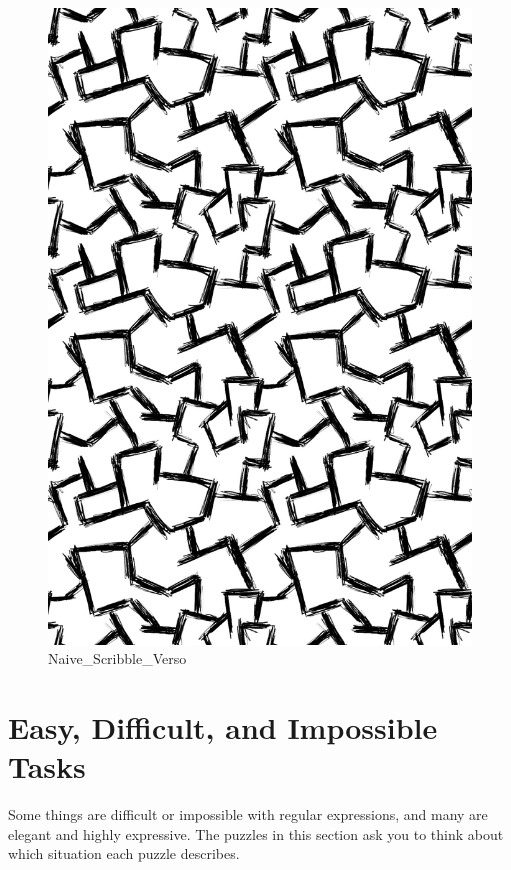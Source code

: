 \begin{figure}
\centering
\includegraphics{images/Naive_Scribble_Verso.png}
\caption{Naive\_Scribble\_Verso}
\end{figure}

\hypertarget{easy-difficult-and-impossible-tasks}{%
\chapter{Easy, Difficult, and Impossible
Tasks}\label{easy-difficult-and-impossible-tasks}}

Some things are difficult or impossible with regular expressions, and
many are elegant and highly expressive. The puzzles in this section ask
you to think about which situation each puzzle describes.

